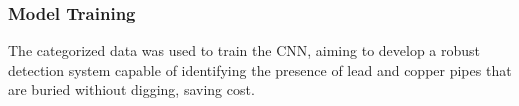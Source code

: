 \subsubsection{Model Training}
The categorized data was used to train the CNN, aiming to develop a robust detection system capable of identifying the presence of lead and copper pipes that are buried withiout digging, saving cost.

 

% 				
% 



